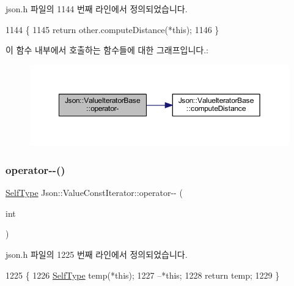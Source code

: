 json.\+h 파일의 1144 번째 라인에서 정의되었습니다.


\begin{DoxyCode}
1144                                                          \{
1145     \textcolor{keywordflow}{return} other.computeDistance(*\textcolor{keyword}{this});
1146   \}
\end{DoxyCode}
이 함수 내부에서 호출하는 함수들에 대한 그래프입니다.\+:
\nopagebreak
\begin{figure}[H]
\begin{center}
\leavevmode
\includegraphics[width=350pt]{class_json_1_1_value_iterator_base_a98e254263fca5f1fc8fcac7bcb0260bf_cgraph}
\end{center}
\end{figure}
\mbox{\label{class_json_1_1_value_const_iterator_a94935961e9331c6f7b907b05ec8df75e}} 
\subsubsection{\texorpdfstring{operator-\/-\/()}{operator--()}\hspace{0.1cm}{\footnotesize\ttfamily [1/2]}}
{\footnotesize\ttfamily \hyperlink{class_json_1_1_value_iterator_base_a9d2a940d03ea06d20d972f41a89149ee}{Self\+Type} Json\+::\+Value\+Const\+Iterator\+::operator-\/-\/ (\begin{DoxyParamCaption}\item[{int}]{ }\end{DoxyParamCaption})\hspace{0.3cm}{\ttfamily [inline]}}



json.\+h 파일의 1225 번째 라인에서 정의되었습니다.


\begin{DoxyCode}
1225                            \{
1226     \hyperlink{class_json_1_1_value_const_iterator_a0c2e33e7eb5a80dd8709fb28ece83933}{SelfType} temp(*\textcolor{keyword}{this});
1227     --*\textcolor{keyword}{this};
1228     \textcolor{keywordflow}{return} temp;
1229   \}
\end{DoxyCode}
\mbox{\label{class_json_1_1_value_const_iterator_a31415e44e44e56fb2bfda7e8bb784646}} 
